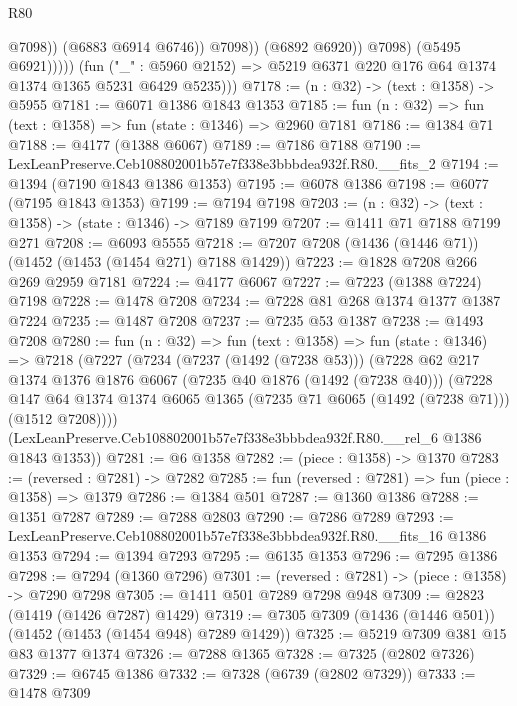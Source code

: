 \begin{lexlean}{R80}
\begin{coremodule}
                              @7098))
                          (@6883 @6914 @6746))
                        @7098))
                    (@6892 @6920))
                  @7098)
                (@5495 @6921)))))
        (fun ("_" : @5960 @2152) => @5219 @6371 @220 @176 @64 @1374 @1374 @1365 @5231 @6429 @5235)))
@7178 := (n : @32) -> (text : @1358) -> @5955
@7181 := @6071 @1386 @1843 @1353
@7185 := fun (n : @32) => fun (text : @1358) => fun (state : @1346) => @2960 @7181
@7186 := @1384 @71
@7188 := @4177 (@1388 @6067)
@7189 := @7186 @7188
@7190 := LexLeanPreserve.Ceb108802001b57e7f338e3bbbdea932f.R80.__fits_2
@7194 := @1394 (@7190 @1843 @1386 @1353)
@7195 := @6078 @1386
@7198 := @6077 (@7195 @1843 @1353)
@7199 := @7194 @7198
@7203 := (n : @32) -> (text : @1358) -> (state : @1346) -> @7189 @7199
@7207 := @1411 @71 @7188 @7199 @271
@7208 := @6093 @5555
@7218 := @7207 @7208 (@1436 (@1446 @71)) (@1452 (@1453 (@1454 @271) @7188 @1429))
@7223 := @1828 @7208 @266 @269 @2959 @7181
@7224 := @4177 @6067
@7227 := @7223 (@1388 @7224) @7198
@7228 := @1478 @7208
@7234 := @7228 @81 @268 @1374 @1377 @1387 @7224
@7235 := @1487 @7208
@7237 := @7235 @53 @1387
@7238 := @1493 @7208
@7280 := fun (n : @32) =>
  fun (text : @1358) =>
  fun (state : @1346) =>
  @7218
    (@7227
      (@7234
        (@7237 (@1492 (@7238 @53)))
        (@7228
          @62
          @217
          @1374
          @1376
          @1876
          @6067
          (@7235 @40 @1876 (@1492 (@7238 @40)))
          (@7228
            @147
            @64
            @1374
            @1374
            @6065
            @1365
            (@7235 @71 @6065 (@1492 (@7238 @71)))
            (@1512 @7208))))
      (LexLeanPreserve.Ceb108802001b57e7f338e3bbbdea932f.R80.__rel_6 @1386 @1843 @1353))
@7281 := @6 @1358
@7282 := (piece : @1358) -> @1370
@7283 := (reversed : @7281) -> @7282
@7285 := fun (reversed : @7281) => fun (piece : @1358) => @1379
@7286 := @1384 @501
@7287 := @1360 @1386
@7288 := @1351 @7287
@7289 := @7288 @2803
@7290 := @7286 @7289
@7293 := LexLeanPreserve.Ceb108802001b57e7f338e3bbbdea932f.R80.__fits_16 @1386 @1353
@7294 := @1394 @7293
@7295 := @6135 @1353
@7296 := @7295 @1386
@7298 := @7294 (@1360 @7296)
@7301 := (reversed : @7281) -> (piece : @1358) -> @7290 @7298
@7305 := @1411 @501 @7289 @7298 @948
@7309 := @2823 (@1419 (@1426 @7287) @1429)
@7319 := @7305 @7309 (@1436 (@1446 @501)) (@1452 (@1453 (@1454 @948) @7289 @1429))
@7325 := @5219 @7309 @381 @15 @83 @1377 @1374
@7326 := @7288 @1365
@7328 := @7325 (@2802 @7326)
@7329 := @6745 @1386
@7332 := @7328 (@6739 (@2802 @7329))
@7333 := @1478 @7309

\end{coremodule}
\end{lexlean}
